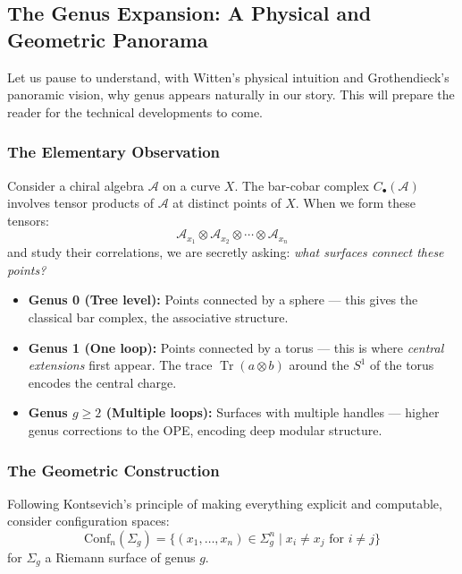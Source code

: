 \subsection{The Genus Expansion: A Physical and Geometric Panorama}
\label{sec:genus_expansion_panorama}

Let us pause to understand, with Witten's physical intuition and Grothendieck's
panoramic vision, why genus appears naturally in our story. This will prepare
the reader for the technical developments to come.

\subsubsection{The Elementary Observation}

Consider a chiral algebra $\mathcal{A}$ on a curve $X$. The bar-cobar complex
$C_{\bullet}(\mathcal{A})$ involves tensor products of $\mathcal{A}$ at distinct
points of $X$. When we form these tensors:
$$\mathcal{A}_{x_1} \otimes \mathcal{A}_{x_2} \otimes \cdots \otimes \mathcal{A}_{x_n}$$
and study their correlations, we are secretly asking: \emph{what surfaces connect
these points?}

\begin{itemize}
\item \textbf{Genus 0 (Tree level):} Points connected by a sphere --- this gives
the classical bar complex, the associative structure.

\item \textbf{Genus 1 (One loop):} Points connected by a torus --- this is where
\emph{central extensions} first appear. The trace $\operatorname{Tr}(a \otimes b)$
around the $S^1$ of the torus encodes the central charge.

\item \textbf{Genus $g \geq 2$ (Multiple loops):} Surfaces with multiple handles ---
higher genus corrections to the OPE, encoding deep modular structure.
\end{itemize}

\subsubsection{The Geometric Construction}

Following Kontsevich's principle of making everything explicit and computable,
consider configuration spaces:
$$\mathrm{Conf}_n(\Sigma_g) = \{ (x_1, \ldots, x_n) \in \Sigma_g^n \mid x_i \neq x_j \text{ for } i \neq j \}$$
for $\Sigma_g$ a Riemann surface of genus $g$.

